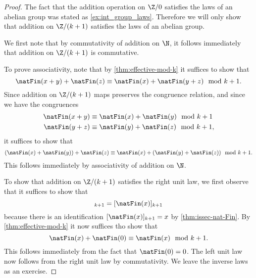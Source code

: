 \begin{proof}
  The fact that the addition operation on $\Z/0$ satisfies the laws of an abelian group was stated as \cref{ex:int_group_laws}. Therefore we will only show that addition on $\Z/{(k+1)}$ satisfies the laws of an abelian group.

  We first note that by commutativity of addition on $\N$, it follows immediately that addition on $\Z/{(k+1)}$ is commutative.

  To prove associativity, note that by \cref{thm:effective-mod-k} it suffices to show that
  \begin{equation*}
    \natFin(x+y)+\natFin(z)\equiv\natFin(x)+\natFin(y+z)\mod k+1.
  \end{equation*}
  Since addition on $\Z/{(k+1)}$ maps preserves the congruence relation, and since we have the congruences
  \begin{align*}
    \natFin(x+y) & \equiv \natFin(x)+\natFin(y) \mod k+1 \\
    \natFin(y+z) & \equiv \natFin(y)+\natFin(z) \mod k+1,
  \end{align*}
  it suffices to show that
  \begin{equation*}
    (\natFin(x)+\natFin(y))+\natFin(z) \equiv \natFin(x)+(\natFin(y)+\natFin(z)) \mod k+1.
  \end{equation*}
  This follows immediately by associativity of addition on $\N$.

  To show that addition on $\Z/{(k+1)}$ satisfies the right unit law, we first observe that it suffices to show that
  \begin{equation*}
    [\natFin(x)+\natFin(0)]_{k+1}=[\natFin(x)]_{k+1}
  \end{equation*}
  because there is an identification $[\natFin(x)]_{k+1}=x$ by \cref{thm:issec-nat-Fin}. By \cref{thm:effective-mod-k} it now suffices tho show that
  \begin{equation*}
    \natFin(x)+\natFin(0)\equiv\natFin(x)\mod k+1. 
  \end{equation*}
  This follows immediately from the fact that $\natFin(0)=0$. The left unit law now follows from the right unit law by commutativity. We leave the inverse laws as an exercise.
\end{proof}


